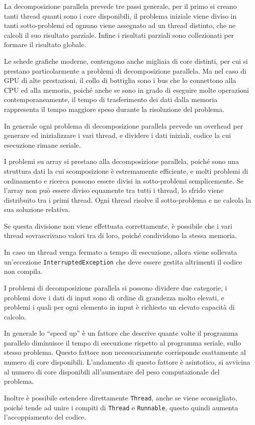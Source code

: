 \documentclass{article}
\numberwithin{equation}{subsection}
\begin{document}
La decomposizione parallela prevede tre passi generale, per il primo si creano tanti thread quanti sono i core disponibili, il problema iniziale viene diviso in 
tanti sotto-problemi ed ognuno viene assegnato ad un thread distinto, che ne calcoli il suo risultato parziale. Infine i risultati parziali sono collezionati per 
formare il risultato globale. 

Le schede grafiche moderne, contengono anche migliaia di core distinti, per cui si prestano particolarmente a problemi di decomposizione parallela. Ma nel caso di GPU 
di alte prestazioni, il collo di bottiglia sono i bus che lo connettono alla CPU ed alla memoria, poiché anche se sono in grado di eseguire molte operazioni contemporaneamente, 
il tempo di trasferimento dei dati dalla memoria rappresenta il tempo maggiore speso durante la risoluzione del problema. 

In generale ogni problema di decomposizione parallela prevede un overhead per generare ed inizializzare i vari thread, e dividere i dati iniziali, codice la cui esecuzione 
rimane seriale. 

I problemi su array si prestano alla decomposizione parallela, poiché sono una struttura dati la cui scomposizione è estremamente efficiente, e molti problemi di ordinamento 
e ricerca possono essere divisi in sotto-problemi semplicemente. Se l'array non può essere diviso equamente tra tutti i thread, lo sfrido viene distribuito tra i primi 
thread. 
Ogni thread risolve il sotto-problema e ne calcola la sua soluzione relativa. 


Se questa divisione non viene effettuata correttamente, è possibile che i vari thread sovrascrivano valori tra di loro, poiché condividono la stessa memoria. 

In caso un thread venga fermato a tempo di esecuzione, allora viene sollevata un'eccezione \verb|InterruptedException| che deve essere gestita altrimenti il codice non 
compila. 

I problemi di decomposizione parallela si possono dividere due categorie, i problemi dove i dati di input sono di ordine di grandezza molto elevati, e problemi i quali 
per ogni elemento in input è richiesto un elevato capacità di calcolo. 

In generale lo ``speed up'' è un fattore che descrive quante volte il programma parallelo diminuisce il tempo di esecuzione rispetto al programma seriale, sullo stesso problema. 
Questo fattore non necessariamente corrisponde esattamente al numero di core disponibili. 
L'andamento di questo fattore è asintotico, si avvicina al numero di core disponibili all'aumentare del peso computazionale del problema. 

Inoltre è possibile estendere direttamente \verb|Thread|, anche se viene sconsigliato, poiché tende ad unire i compiti di \verb|Thread| e \verb|Runnable|, questo quindi 
aumenta l'accoppiamento del codice.  
\end{document}
